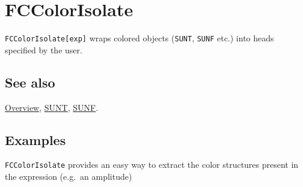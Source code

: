 \documentclass[../FeynCalcManual.tex]{subfiles}
\begin{document}
\hypertarget{fccolorisolate}{
\section{FCColorIsolate}\label{fccolorisolate}}

\texttt{FCColorIsolate[\allowbreak{}exp]} wraps colored objects
(\texttt{SUNT}, \texttt{SUNF} etc.) into heads specified by the user.

\subsection{See also}

\hyperlink{toc}{Overview}, \hyperlink{sunt}{SUNT},
\hyperlink{sunf}{SUNF}.

\subsection{Examples}

\texttt{FCColorIsolate} provides an easy way to extract the color
structures present in the expression (e.g.~an amplitude)
\end{document}
